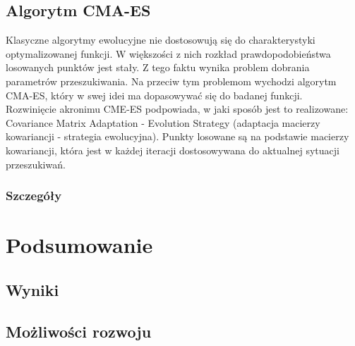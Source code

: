 \documentclass{mini}
\begin{document}
\subsection{Algorytm CMA-ES}
Klasyczne algorytmy ewolucyjne nie dostosowują się do charakterystyki optymalizowanej funkcji. W większości z nich rozkład prawdopodobieństwa losowanych punktów jest stały. Z tego faktu wynika problem dobrania parametrów przeszukiwania. Na przeciw tym problemom wychodzi algorytm CMA-ES, który w swej idei ma dopasowywać się do badanej funkcji.\\
Rozwinięcie akronimu CME-ES podpowiada, w jaki sposób jest to realizowane: Covariance Matrix Adaptation - Evolution Strategy (adaptacja macierzy kowariancji - strategia ewolucyjna). Punkty losowane są na podstawie macierzy kowariancji, która jest w każdej iteracji dostosowywana do aktualnej sytuacji przeszukiwań.

\subsubsection{Szczegóły}

\pagebreak

\section{Podsumowanie}

\subsection{Wyniki}

\subsection{Możliwości rozwoju}

\pagebreak

\begin{thebibliography}{9}

\end{thebibliography}

\makestatement
\end{document}
